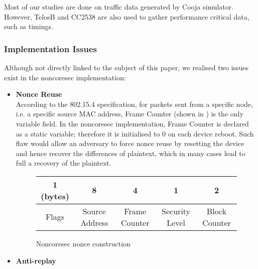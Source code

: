 Most of our studies are done on traffic data generated by Cooja simulator\cite{Contiki}. However, TelosB\cite{TelosB} and CC2538\cite{CC2538} are also used to gather performance critical data, such as timings.

\subsubsection{Implementation Issues}
Although not directly linked to the subject of this paper, we realised two issues exist in the noncoresec implementation:
\begin{itemize}
	\item \textbf{Nonce Reuse} \\
	According to the 802.15.4 specification\cite{802154}, for packets sent from a specific node, i.e. a specific source MAC address, Frame Counter (shown in ) is the only variable field. In the noncoresec implementation, Frame Counter is declared as a static variable; therefore it is initialised to 0 on each device reboot. Such flaw would allow an adversary to force nonce reuse by resetting the device and hence recover the differences of plaintext, which in many cases lead to full a recovery of the plaintext.
	
	\begin{figure}[th!]
	\centering
	\begin{tabular}{|c|c|c|c|c|}
		\hline 
		1 (bytes) & 8              & 4             & 1              & 2             \\ \hline
		Flags      & Source Address & Frame Counter & Security Level & Block Counter \\ \hline
	\end{tabular}
	\caption{Noncoresec nonce construction}
	\label{NoncoresecNonce}
	\end{figure}
	
	\item \textbf{Anti-replay}
	
	
\end{itemize}


